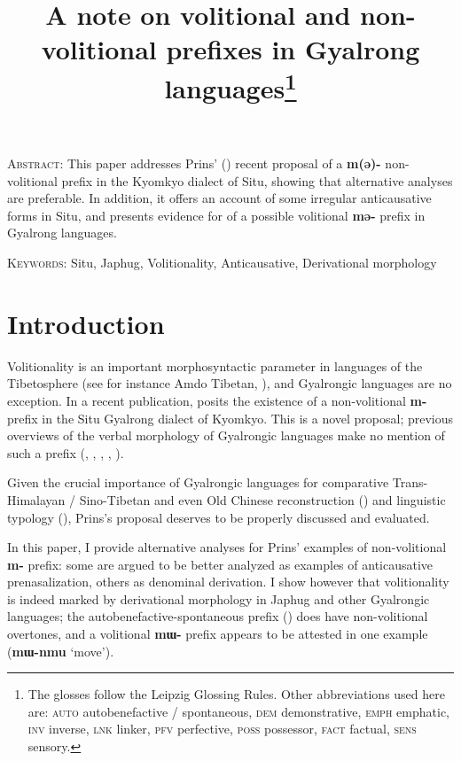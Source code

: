 \documentclass[oneside,a4paper,11pt]{article}
\newcommand{\ipa}[1]{\textbf{{\phon\mbox{#1}}}} %
\begin{document}
\title{A note on volitional and non-volitional prefixes in Gyalrong languages\footnote{The glosses follow the Leipzig Glossing Rules. Other abbreviations used here are:  \textsc{auto} autobenefactive / spontaneous,  \textsc{dem} demonstrative,  \textsc{emph} emphatic, \textsc{inv} inverse,  \textsc{lnk} linker, \textsc{pfv} perfective, \textsc{poss} possessor, \textsc{fact} factual,  \textsc{sens} sensory. }}
\maketitle

\textsc{Abstract}: This paper addresses Prins' (\citeyear{prins16kyomkyo}) recent proposal of a \ipa{m(ə)-} non-volitional prefix in the Kyomkyo dialect of Situ, showing that alternative analyses are preferable. In addition, it offers an account of some irregular anticausative forms in Situ, and presents evidence for of a possible volitional \ipa{mə-} prefix in Gyalrong languages.

\textsc{Keywords}: Situ, Japhug, Volitionality, Anticausative, Derivational morphology

\section*{Introduction}
Volitionality is an important morphosyntactic parameter in languages of the Tibetosphere (see for instance Amdo Tibetan, \citealt[960-3]{sun93evidentiality}), and Gyalrongic languages are no exception. In a recent publication, \citet[505-6]{prins16kyomkyo} posits the existence of a non-volitional \ipa{m-} prefix in the Situ Gyalrong dialect of Kyomkyo. This is a novel proposal; previous overviews of the verbal  morphology of Gyalrongic languages make no mention of such a prefix (\citealt{jackson03caodeng}, \citealt{jackson06paisheng}, \citealt{jacques12demotion}, \citealt{lai13affixale} \citealt{jackson14morpho},  \citealt{jacques17sketch}).

Given the crucial importance of Gyalrongic languages for comparative Trans-Himalayan / Sino-Tibetan and even Old Chinese reconstruction (\citealt{gong17xingtaixue, gong17clusters}) and linguistic typology (\citealt{jacques13harmonization, jacques14antipassive}), Prins's proposal deserves to be properly discussed and  evaluated.

In this paper, I provide alternative analyses for Prins' examples of non-volitional \ipa{m-} prefix: some are argued to be better analyzed as examples of anticausative prenasalization, others as denominal derivation. I show however that volitionality is indeed marked by derivational morphology in Japhug and other Gyalrongic languages; the autobenefactive-spontaneous prefix (\citealt{jacques16japhug}) does have non-volitional overtones, and a volitional \ipa{mɯ-} prefix appears to be attested in one example (\ipa{mɯ-nmu} `move').
\end{document}
